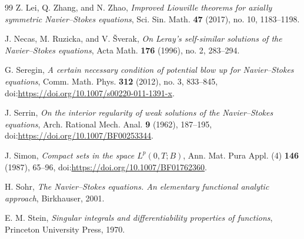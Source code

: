 \documentclass[11pt]{amsart}
\theoremstyle{plain}
\theoremstyle{definition}
\theoremstyle{remark}
\numberwithin{equation}{section}
\begin{document}
\begin{thebibliography}{99}
Z. Lei, Q. Zhang, and N. Zhao,
\emph{Improved Liouville theorems for axially symmetric Navier--Stokes equations},
Sci. Sin. Math. \textbf{47} (2017), no. 10, 1183--1198.

J. Necas, M. Ruzicka, and V. \v{S}verak,
\emph{On Leray's self-similar solutions of the Navier--Stokes equations},
Acta Math. \textbf{176} (1996), no. 2, 283--294.

G. Seregin,
\emph{A certain necessary condition of potential blow up for Navier--Stokes equations},
Comm. Math. Phys. \textbf{312} (2012), no. 3, 833--845,
doi:\url{https://doi.org/10.1007/s00220-011-1391-x}.

J. Serrin,
\emph{On the interior regularity of weak solutions of the Navier--Stokes equations},
Arch. Rational Mech. Anal. \textbf{9} (1962), 187--195,
doi:\url{https://doi.org/10.1007/BF00253344}.

J. Simon,
\emph{Compact sets in the space \(L^p(0,T;B)\)},
Ann. Mat. Pura Appl. (4) \textbf{146} (1987), 65--96,
doi:\url{https://doi.org/10.1007/BF01762360}.

H. Sohr,
\emph{The Navier--Stokes equations. An elementary functional analytic approach},
Birkhauser, 2001.

E. M. Stein,
\emph{Singular integrals and differentiability properties of functions},
Princeton University Press, 1970.

\end{thebibliography}
\end{document}
